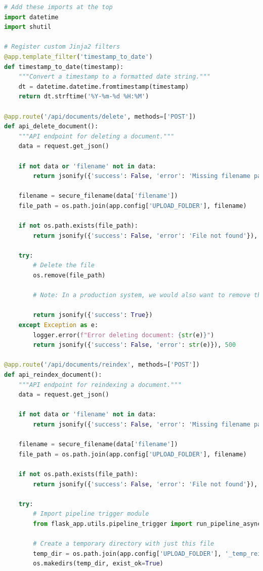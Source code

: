 \documentclass[
  screen,review,acmlarge]{acmart}
\begin{document}
\begin{lstlisting}[language=Python]
# Add these imports at the top
import datetime
import shutil

# Register custom Jinja2 filters
@app.template_filter('timestamp_to_date')
def timestamp_to_date(timestamp):
    """Convert a timestamp to a formatted date string."""
    dt = datetime.datetime.fromtimestamp(timestamp)
    return dt.strftime('%Y-%m-%d %H:%M')

@app.route('/api/documents/delete', methods=['POST'])
def api_delete_document():
    """API endpoint for deleting a document."""
    data = request.get_json()
    
    if not data or 'filename' not in data:
        return jsonify({'success': False, 'error': 'Missing filename parameter'}), 400
    
    filename = secure_filename(data['filename'])
    file_path = os.path.join(app.config['UPLOAD_FOLDER'], filename)
    
    if not os.path.exists(file_path):
        return jsonify({'success': False, 'error': 'File not found'}), 404
    
    try:
        # Delete the file
        os.remove(file_path)
        
        # Note: In a production system, we would also want to remove the document from the vector database
        
        return jsonify({'success': True})
    except Exception as e:
        logger.error(f"Error deleting document: {str(e)}")
        return jsonify({'success': False, 'error': str(e)}), 500

@app.route('/api/documents/reindex', methods=['POST'])
def api_reindex_document():
    """API endpoint for reindexing a document."""
    data = request.get_json()
    
    if not data or 'filename' not in data:
        return jsonify({'success': False, 'error': 'Missing filename parameter'}), 400
    
    filename = secure_filename(data['filename'])
    file_path = os.path.join(app.config['UPLOAD_FOLDER'], filename)
    
    if not os.path.exists(file_path):
        return jsonify({'success': False, 'error': 'File not found'}), 404
    
    try:
        # Import pipeline trigger module
        from flask_app.utils.pipeline_trigger import run_pipeline_async
        
        # Create a temporary directory with just this file
        temp_dir = os.path.join(app.config['UPLOAD_FOLDER'], '_temp_reindex')
        os.makedirs(temp_dir, exist_ok=True)
        

\end{lstlisting}
\end{document}
